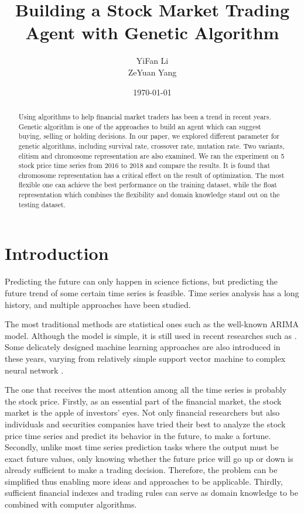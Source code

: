 \documentclass{article}
\title{Building a Stock Market Trading Agent with Genetic Algorithm}
\author{YiFan Li\\ZeYuan Yang}
\date{\today}
\begin{document}
\maketitle
{}


\begin{abstract}

Using algorithms to help financial market traders has been a trend in recent years.
Genetic algorithm is one of the approaches to build an agent
which can suggest buying, selling or holding decisions.
In our paper, we explored different parameter for genetic algorithms,
including survival rate, crossover rate, mutation rate.
Two variants, elitism and chromosome representation are also examined.
We ran the experiment on 5 stock price time series from 2016 to 2018 and compare the results.
It is found that chromosome representation has a critical effect on the result of optimization.
The most flexible one can achieve the best performance on the training dataset,
while the float representation which combines the flexibility and domain knowledge
stand out on the testing dataset.


\end{abstract}

\section{Introduction}

Predicting the future can only happen in science fictions,
but predicting the future trend of some certain time series is feasible.
Time series analysis has a long history, and multiple approaches have been studied.

The most traditional methods are statistical ones such as the well-known ARIMA model.
Although the model is simple, it is still used in recent researches such as \cite{arima-bus-travel}.
Some delicately designed machine learning approaches are also introduced in these years,
varying from relatively simple support vector machine \cite{support-vector-machine}
to complex neural network \cite{time-series-prediction-and-neural-networks}.

The one that receives the most attention among all the time series is probably the stock price.
Firstly, as an essential part of the financial market, the stock market is the apple of investors' eyes.
Not only financial researchers but also individuals and securities companies have
tried their best to analyze the stock price time series and predict its behavior in the future,
to make a fortune.
Secondly, unlike most time series prediction tasks where the output must be exact future values,
only knowing whether the future price will go up or down is already sufficient to make a trading decision.
Therefore, the problem can be simplified thus enabling more ideas and approaches to be applicable.
Thirdly, sufficient financial indexes and trading rules
can serve as domain knowledge to be combined with computer algorithms.
\end{document}
